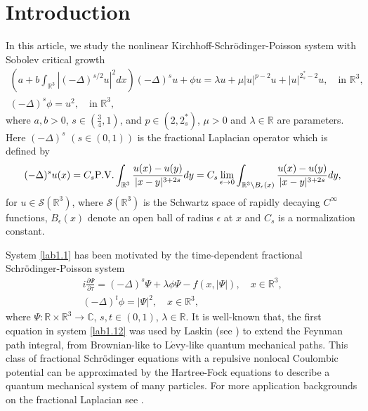 \section{Introduction}

In this article, we study the nonlinear Kirchhoff-Schr\"odinger-Poisson system
with Sobolev critical growth
\begin{equation}\label{lab1.1}
\begin{gathered}
(a+b\int_{\mathbb{R}^3}|(-\Delta)^{s/2}u|^2dx)(-\Delta)^s u+ \phi u
= \lambda u+\mu|u|^{p-2}u+|u|^{{2^*_s}-2}u,  \quad \text{in }\mathbb{R}^3, \\
(-\Delta)^s \phi=u^2, \quad   \text{in }\mathbb{R}^3,
\end{gathered}
\end{equation}
where $a,b>0$, $s\in(\frac{3}{4},1)$, and  $p \in(2,2^*_s)$,  $\mu>0$ and
$\lambda \in \mathbb{R}$ are parameters.
Here $(-\Delta)^s$ $(s\in(0,1))$ is the fractional Laplacian operator which is
defined by
$$
(-\Delta)^s u(x)=C_s {\rm P.V.}\int_{\mathbb{R}^3}\frac{u(x)-u(y)}{|x-y|^{3+2s}}dy
=C_s\lim_{\epsilon\to 0}\int_{{\mathbb{R}^3}
\setminus B_\epsilon(x)}\frac{u(x)-u(y)}{|x-y|^{3+2s}}dy,
$$
for $u\in \mathcal{S}(\mathbb{R}^3)$, where $\mathcal{S}(\mathbb{R}^3) $ is the
Schwartz space  of rapidly decaying $C^\infty$ functions, $B_\epsilon(x)$ denote an
open ball of radius $\epsilon$ at $x$ and $C_s$ is a normalization constant.

System \eqref{lab1.1} has been motivated by the
time-dependent fractional Schr\"odinger-Poisson system
\begin{equation}\label{lab1.12}
\begin{gathered}
i\frac{\partial \Psi}{\partial \tau } =(-\Delta)^s\Psi +\lambda\phi\Psi-f(x,|\Psi|),
\quad  x\in \mathbb{R}^3,\\
(-\Delta)^t\phi=|\Psi|^2, \quad  x\in \mathbb{R}^3,
\end{gathered}
\end{equation}
where $\Psi: {\mathbb{R}\times \mathbb{R}^3}\to \mathbb{C}$, $s,t \in(0,1)$,
$\lambda \in \mathbb{R}$. It is well-known that, the first equation in
system \eqref{lab1.12} was used by Laskin (see \cite{L2998, L3998}) to extend the Feynman path integral, from Brownian-like to L$\mathrm {\acute{e}}$vy-like quantum mechanical paths. This class of fractional Schr\"odinger equations with a repulsive nonlocal Coulombic potential can be approximated by the Hartree-Fock equations to describe a quantum mechanical system of many particles. For more application backgrounds on the fractional Laplacian see \cite{C4998, D7998, M6998}.

